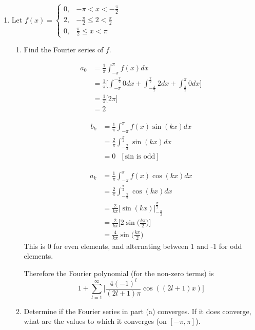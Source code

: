 \documentclass{article}
\begin{document}
\thispagestyle{fancy}

\begin{enumerate}
\item Let $\displaystyle f(x) = 
\begin{cases}
        0, &- \pi < x < -\frac{\pi}{2} \\
        2, &- \frac{\pi}{2}\leq 2 < \frac{\pi}{2} \\
        0, & \frac{\pi}{2} \leq x < \pi
\end{cases}
$
\begin{enumerate}
\item Find the Fourier series of $f$.
\begin{multicols}{2}
\noindent

\begin{align*}
a_0 &= \frac{1}{\pi} \int_{-\pi}^{\pi}f(x)dx \\
&= \frac{1}{\pi} \Bigg[ \int_{-\pi}^{-\frac{\pi}{2}}0dx + \int_{-\frac{\pi}{2}}^{\frac{\pi}{2}}2dx + \int_{\frac{\pi}{2}}^{\pi}0dx \Bigg]\\
&= \frac{1}{\pi} \Bigg[2\pi\Bigg]\\
&= 2
\end{align*}

\begin{align*}
b_k &= \frac{1}{\pi} \int_{-\pi}^{\pi}f(x)\sin(kx)dx \\
&= \frac{2}{\pi} \int_{-\frac{\pi}{2}}^{\frac{\pi}{2}}\sin(kx)dx \\
&= 0 \: \: \: [\text{sin is odd}]
\end{align*}

\begin{align*}
a_k &= \frac{1}{\pi} \int_{-\pi}^{\pi}f(x)\cos(kx)dx \\
&= \frac{2}{\pi} \int_{-\frac{\pi}{2}}^{\frac{\pi}{2}}\cos(kx)dx \\
&= \frac{2}{k\pi} \Bigg[\sin(kx)\Bigg]_{-\frac{\pi}{2}}^{\frac{\pi}{2}} \\
&= \frac{2}{k\pi} \Bigg[2\sin\Big(\frac{k\pi}{2}\Big)\Bigg]\\
&= \frac{4}{k\pi} \sin\Big(\frac{k\pi}{2}\Big)
\end{align*}
This is 0 for even elements, and alternating between 1 and -1 for odd elements.
\end{multicols}

Therefore the Fourier polynomial (for the non-zero terms) is 
\[
    1 + \sum_{l=1}^{\infty} \Bigg[ \frac{4(-1)^l}{(2l+1)\pi}\cos((2l+1)x)\Bigg]
\]
\item Determine if the Fourier series in part (a) converges. If it does converge, what are the values to which it converges (on $[-\pi, \pi]$).


\end{enumerate}
\end{enumerate}
\end{document}
